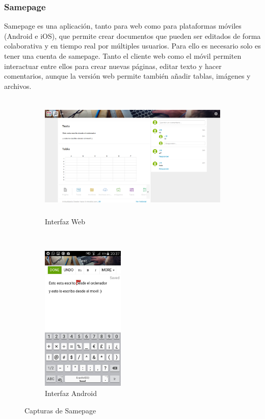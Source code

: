 	\subsubsection{Samepage}
	
	Samepage \cite{ref:samepage} es una aplicación, tanto para web como para plataformas móviles (Android e iOS), que permite crear documentos que pueden ser editados de forma colaborativa y en tiempo real por múltiples usuarios. Para ello es necesario solo es tener una cuenta de samepage. Tanto el cliente web como el móvil permiten interactuar entre ellos para crear nuevas páginas, editar texto y hacer comentarios, aunque la versión web permite también añadir tablas, imágenes y archivos.
	
	\begin{figure}[H]
        \centering
        \begin{subfigure}[b]{0.6\textwidth}
                \includegraphics[width=\textwidth, height=6cm]{Media/Captures/samepageWeb.png}
                \caption{Interfaz Web}
                \label{fig:samepageWeb}
        \end{subfigure}
        ~
        \begin{subfigure}[b]{0.3\textwidth}
                \includegraphics[width=\textwidth, height=7cm]{Media/Captures/samepageApp.jpg}
                \caption{Interfaz Android}
                \label{fig:samepageApp}
        \end{subfigure}
        \caption{Capturas de Samepage}\label{fig:samepageCaptures}
	\end{figure}
	

